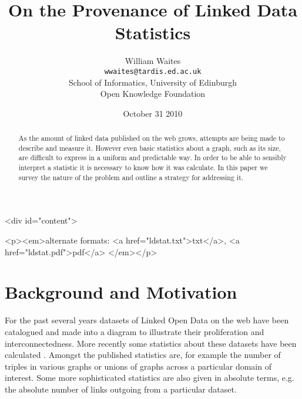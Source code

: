 \documentclass{article}
\begin{document}
\begin{htmlonly}
  \begin{rawhtml}
    <div id="content">
  \end{rawhtml}
\end{htmlonly}
\title{On the Provenance of Linked Data Statistics}
\date{October 31 2010}
\author{William Waites\\
  \texttt{wwaites@tardis.ed.ac.uk}\\
  School of Informatics, University of Edinburgh\\
  Open Knowledge Foundation
}
\maketitle 
\begin{htmlonly}
  \begin{center}
  \begin{rawhtml}
    <p><em>alternate formats: 
        <a href="ldstat.txt">txt</a>,
        <a href="ldstat.pdf">pdf</a>
    </em></p>
  \end{rawhtml}
  \end{center}
\end{htmlonly}
\begin{abstract}
  As the amount of linked data published on the web grows,
  attempts are being made to describe and measure it. However
  even basic statistics about a graph, such as its size, 
  are difficult to express in a uniform and predictable
  way. In order to be able to sensibly interpret a statistic
  it is necessary to know how it was calculate. In this paper
  we survey the nature of the problem and outline a strategy
  for addressing it.
\end{abstract}

\section{Background and Motivation}

For the past several years datasets of Linked Open Data on
the web have been catalogued and made into a diagram 
\cite{LODC10} to illustrate their proliferation and 
interconnectedness. More recently some statistics about
these datasets have been calculated \cite{LODS10}. 
Amongst the published statistics are, for example the number
of triples in various graphs or unions of graphs across
a particular domain of interest. Some more sophisticated
statistics are also given in absolute terms, e.g. the
absolute number of links outgoing from a particular
dataset.
\end{document}
